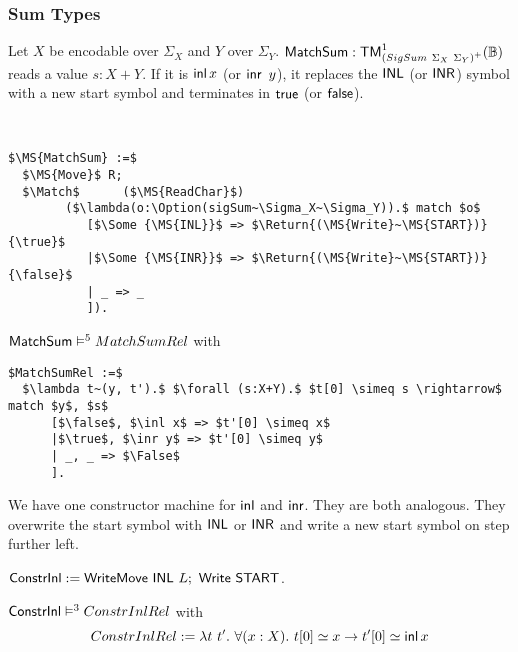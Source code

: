 \subsubsection{Sum Types}
\label{sec:match-sum}

Let $X$ be encodable over $\Sigma_X$ and $Y$ over $\Sigma_Y$.  $\mathsf{MatchSum} : \mathsf{TM}_{\left(SigSum~\Sigma_X~\Sigma_Y\right)^+}^1(\mathbb{B})$ reads a value
$s:X+Y$.  If it is $\operatorname{\mathsf{inl}} x$ (or $\operatorname{\mathsf{inr}}~y$), it replaces the $\mathsf{INL}$ (or $\mathsf{INR}$) symbol with a new start symbol and terminates in $\mathsf{true}$ (or
$\mathsf{false}$).

\begin{definition}[$\MS{MatchSum}$]
  \label{def:MatchSum}
  ~
  \small
\begin{lstlisting}[style=semicoqstyle]
$\MS{MatchSum} :=$
  $\MS{Move}$ R; 
  $\Match$      ($\MS{ReadChar}$) 
        ($\lambda(o:\Option(sigSum~\Sigma_X~\Sigma_Y)).$ match $o$
           [$\Some {\MS{INL}}$ => $\Return{(\MS{Write}~\MS{START})}{\true}$
           |$\Some {\MS{INR}}$ => $\Return{(\MS{Write}~\MS{START})}{\false}$
           | _ => _ 
           ]).
\end{lstlisting}
\end{definition}

\begin{lemma}
  \label{lem:MatchSum_Realise}
  $\mathsf{MatchSum} \mathrel{\vDash^{5}} MatchSumRel$ with
\begin{lstlisting}[style=semicoqstyle]
$MatchSumRel :=$
  $\lambda t~(y, t').$ $\forall (s:X+Y).$ $t[0] \simeq s \rightarrow$ match $y$, $s$
      [$\false$, $\inl x$ => $t'[0] \simeq x$
      |$\true$, $\inr y$ => $t'[0] \simeq y$
      | _, _ => $\False$
      ].
\end{lstlisting}
\end{lemma}

We have one constructor machine for $\operatorname{\mathsf{inl}}$ and $\operatorname{\mathsf{inr}}$.  They are both analogous.  They overwrite the start symbol with $\mathsf{INL}$ or $\mathsf{INR}$ and
write a new start symbol on step further left.
\begin{definition}[$\MS{ConstrInl}$]
  \label{def:Constr_inl}
  $\mathsf{ConstrInl} := \mathsf{WriteMove}~\mathsf{INL}~L ;~ \mathsf{Write}~\mathsf{START}$.
\end{definition}
\begin{lemma}
  \label{lem:Constr_inl_Sem}
  $\mathsf{ConstrInl} \mathrel{\vDash^{3}} ConstrInlRel$ with
  \[
    ConstrInlRel := \lambda t~t'.~\forall(x:X).~t[0] \simeq x \rightarrow t'[0] \simeq \operatorname{\mathsf{inl}} x
  \]
\end{lemma}

